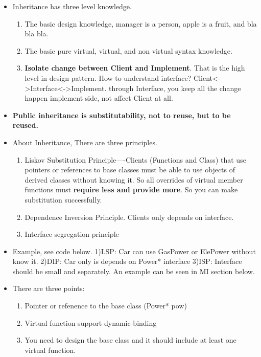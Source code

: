\documentclass[a4paper,12pt,twoside]{book}
\begin{document}
\begin{itemize}
\item Inheritance has three level knowledge.
\begin{enumerate}
\item The basic design knowledge, manager is a person, apple is a fruit, and bla bla bla.
\item The basic  pure virtual, virtual, and non virtual syntax knowledge.
\item \textbf{Isolate change between Client and Implement}. That is the high level in design pattern. How to understand interface? Client<->Interface<->Implement. through Interface, you keep all the change happen implement side, not affect Client at all.
\end{enumerate}

\item \textbf{Public inheritance is substitutability, not to reuse, but to be reused. }
\item About Inheritance, There are three principles.
\begin{enumerate}
\item Liskov Substitution Principle----Clients (Functions and Class) that use pointers or references to base classes must be able to use objects of derived classes without knowing it.  So all overrides of virtual member functions must \textbf{require less and provide more}. So you can make substitution successfully.

\item Dependence Inversion Principle. Clients only depends on interface.
\item Interface segregation principle
\end{enumerate}

\item Example, see code below.  1)LSP: Car can use  GasPower or ElePower without know it. 2)DIP: Car only is depends on Power* interface 3)ISP: Interface should be small and separately. An example can be seen in MI section below.

\item There are three points:
\begin{enumerate}
\item Pointer or refenence to the base class (Power* pow)
\item Virtual function support dynamic-binding
\item You need to design the base class and it should include at least one virtual function.
\end{enumerate}


\end{itemize}
\end{document}
